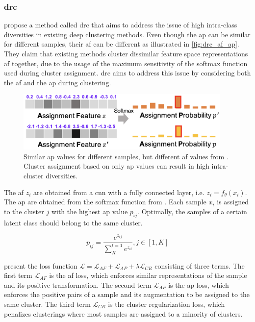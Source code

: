 \subsubsection{\ac{drc}}\label{subsubsec:drc}

\citet{DRC_2020} propose a method called \ac{drc} 
that aims to address the issue of high intra-class diversities in existing deep clustering methods.
Even though the \ac{ap} can be similar for different samples, their \ac{af} can be different 
as illustrated in \autoref{fig:drc_af_ap}.
They claim that existing methods cluster dissimilar feature space representations \ac{af} together,
due to the usage of the maximum sensitivity of the softmax function used during cluster assignment.
\ac{drc} aims to address this issue by considering both the \ac{af} and the \ac{ap} during clustering.

\begin{figure}[!htb] %
    \centering
    \includegraphics[width=300pt]{images/DRC_af_ap.png}
    \caption{Similar \ac{ap} values for different samples, but different \ac{af} values from \citet{DRC_2020}.
    Cluster assignment based on only \ac{ap} values can result in high intra-cluster diversities.}
    \label{fig:drc_af_ap}
\end{figure}

The \ac{af} $z_i$ are obtained from a \ac{cnn} with a fully connected layer, i.e. $z_i = f_\theta(x_i)$.
The \ac{ap} are obtained from the softmax function from . 
Each sample $x_i$ is assigned to the cluster $j$ with the highest \ac{ap} value $p_{ij}$.
Optimally, the samples of a certain latent class should belong to the same cluster.

\begin{equation}
    p_{ij} = \frac{e^{z_{ij}}}{\sum_{K}^{t=1}e^{z_{it}}}, j \in \left[1,K\right]
    \label{eq:ap}
\end{equation}

\citeauthor{DRC_2020} present the loss function $\mathcal{L} = \mathcal{L}_{AF} + \mathcal{L}_{AP}  + \lambda \mathcal{L}_{CR}$  consisting of three terms.
The first term $\mathcal{L}_{AF}$ is the \ac{af} loss, which enforces similar representations of the sample and its positive transformation.
The second term $\mathcal{L}_{AP}$ is the \ac{ap} loss, which enforces the positive pairs of a sample and its augmentation 
to be assigned to the same cluster.
The third term $\mathcal{L}_{CR}$ is the cluster regularization loss, which penalizes clusterings where most samples are assigned to a minority of clusters.